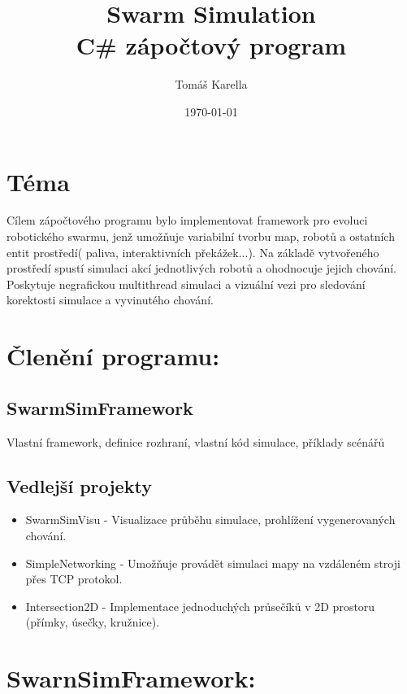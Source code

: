 \documentclass[12pt, oneside]{article}
\title{\vspace{-12ex}Swarm Simulation\\ C\# zápočtový program }
\author{\vspace{-10ex}Tomáš Karella}
\date{\today}
\begin{document}
\maketitle
\section{Téma}
Cílem zápočtového programu bylo implementovat framework pro evoluci robotického swarmu, jenž umožňuje variabilní tvorbu map, robotů a ostatních entit prostředí( paliva, interaktivních překážek...). Na základě vytvořeného prostředí spustí simulaci akcí jednotlivých robotů a ohodnocuje jejich chování. Poskytuje negrafickou multithread simulaci a vizuální vezi pro sledování korektosti simulace a vyvinutého chování. 
\section{Členění programu:}
\subsection{SwarmSimFramework} 
Vlastní framework, definice rozhraní, vlastní kód simulace, příklady scénářů
\subsection{Vedlejší projekty}
\begin{itemize}
\item SwarmSimVisu - 
Visualizace průběhu simulace, prohlížení vygenerovaných chování. 
\item SimpleNetworking -
Umožňuje provádět simulaci mapy na vzdáleném stroji přes TCP protokol.
\item Intersection2D - 
Implementace jednoduchých průsečíků v 2D prostoru (přímky, úsečky, kružnice).
\end{itemize}
\newpage
\section{SwarnSimFramework:}
\end{document}
